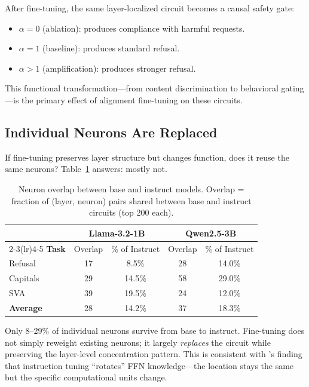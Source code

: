 \documentclass{article}
\begin{document}
After fine-tuning, the same layer-localized circuit becomes a causal safety gate:
\begin{itemize}
\item $\alpha = 0$ (ablation): produces compliance with harmful requests.
\item $\alpha = 1$ (baseline): produces standard refusal.
\item $\alpha > 1$ (amplification): produces stronger refusal.
\end{itemize}

This functional transformation---from content discrimination to behavioral gating---is the primary effect of alignment fine-tuning on these circuits.

\subsection{Individual Neurons Are Replaced}
\label{sec:overlap}

If fine-tuning preserves layer structure but changes function, does it reuse the same neurons?
Table~\ref{tab:overlap} answers: mostly not.

\begin{table}[t]
\caption{Neuron overlap between base and instruct models. Overlap = fraction of (layer, neuron) pairs shared between base and instruct circuits (top 200 each).}
\label{tab:overlap}
\vskip 0.1in
\begin{center}
\begin{tabular}{lcccc}
\toprule
& \multicolumn{2}{c}{\textbf{Llama-3.2-1B}} & \multicolumn{2}{c}{\textbf{Qwen2.5-3B}} \\
\cmidrule(lr){2-3}\cmidrule(lr){4-5}
\textbf{Task} & Overlap & \% of Instruct & Overlap & \% of Instruct \\
\midrule
Refusal   & 17 & 8.5\% & 28 & 14.0\% \\
Capitals  & 29 & 14.5\% & 58 & 29.0\% \\
SVA       & 39 & 19.5\% & 24 & 12.0\% \\
\midrule
\textbf{Average} & 28 & 14.2\% & 37 & 18.3\% \\
\bottomrule
\end{tabular}
\end{center}
\end{table}

Only 8--29\% of individual neurons survive from base to instruct.
Fine-tuning does not simply reweight existing neurons; it largely \emph{replaces} the circuit while preserving the layer-level concentration pattern.
This is consistent with \citet{wu2024instruction}'s finding that instruction tuning ``rotates'' FFN knowledge---the location stays the same but the specific computational units change.
\end{document}
